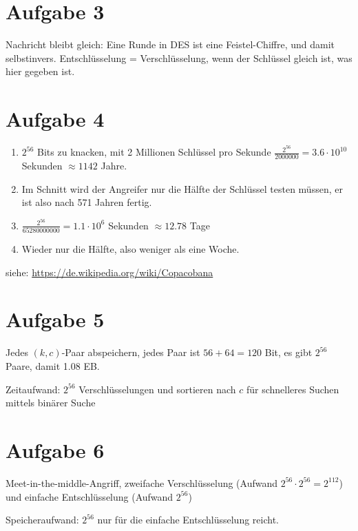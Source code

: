 \documentclass{article}
\begin{document}
	\section*{Aufgabe 3}
	Nachricht bleibt gleich: Eine Runde in DES ist eine Feistel-Chiffre, und damit selbstinvers. Entschlüsselung = Verschlüsselung, wenn der Schlüssel gleich ist, was hier gegeben ist. 
	
	\section*{Aufgabe 4}
	\begin{enumerate}[label=(\alph*)]
		\item $2^{56}$ Bits zu knacken, mit 2 Millionen Schlüssel pro Sekunde $\frac{2^{56}}{2000000} = 3.6\cdot 10^{10}$ Sekunden $\approx 1142$ Jahre.
		\item Im Schnitt wird der Angreifer nur die Hälfte der Schlüssel testen müssen, er ist also nach 571 Jahren fertig.
		\item $\frac{2^{56}}{65280000000} = 1.1\cdot 10^6$ Sekunden $\approx 12.78$ Tage
		\item Wieder nur die Hälfte, also weniger als eine Woche.
	\end{enumerate}
	siehe: \url{https://de.wikipedia.org/wiki/Copacobana}
	
	\section*{Aufgabe 5}
	Jedes $(k,c)$-Paar abspeichern, jedes Paar ist $56 + 64 = 120$ Bit, es gibt $2^{56}$ Paare, damit 1.08 EB.
	
	Zeitaufwand: $2^{56}$ Verschlüsselungen und sortieren nach $c$ für schnelleres Suchen mittels binärer Suche
	
	\section*{Aufgabe 6}
	Meet-in-the-middle-Angriff, zweifache Verschlüsselung (Aufwand $2^{56}\cdot 2^{56} = 2^{112}$) und einfache Entschlüsselung (Aufwand $2^{56}$)
	
	Speicheraufwand: $2^{56}$ nur für die einfache Entschlüsselung reicht.
\end{document}
